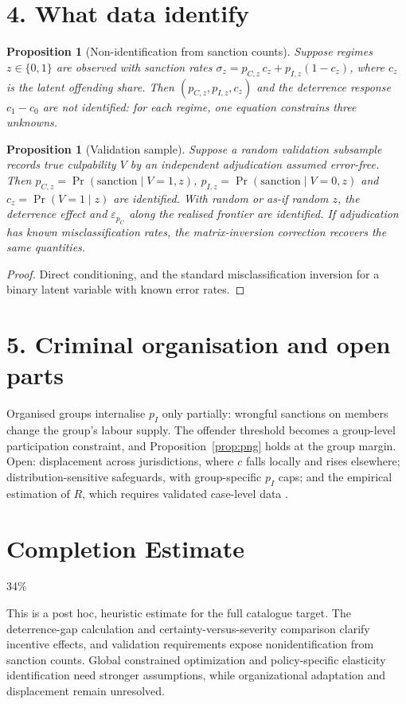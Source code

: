 \documentclass[11pt]{article}
\newtheorem{proposition}[theorem]{Proposition}
\theoremstyle{definition}
\begin{document}
\section*{4. What data identify}
\begin{proposition}[Non-identification from sanction counts]\label{prop:nonid}
Suppose regimes $z\in\{0,1\}$ are observed with sanction rates $\sigma_z=p_{C,z}\,c_z+p_{I,z}(1-c_z)$, where $c_z$ is the
latent offending share. Then $(p_{C,z},p_{I,z},c_z)$ and the deterrence response $c_1-c_0$ are not identified: for each
regime, one equation constrains three unknowns.
\end{proposition}
\begin{proposition}[Validation sample]\label{prop:val}
Suppose a random validation subsample records true culpability $V$ by an independent adjudication assumed error-free.
Then $p_{C,z}=\Pr(\text{sanction}\mid V=1,z)$, $p_{I,z}=\Pr(\text{sanction}\mid V=0,z)$ and $c_z=\Pr(V=1\mid z)$ are
identified. With random or as-if random $z$, the deterrence effect and $\varepsilon_{p_C}$ along the realised frontier are
identified. If adjudication has known misclassification rates, the matrix-inversion correction recovers the same quantities.
\end{proposition}
\begin{proof}
Direct conditioning, and the standard misclassification inversion for a binary latent variable with known error rates.
\end{proof}

\section*{5. Criminal organisation and open parts}
Organised groups internalise $p_I$ only partially: wrongful sanctions on members change the group's labour supply. The
offender threshold becomes a group-level participation constraint, and Proposition~\ref{prop:png} holds at the group
margin. Open: displacement across jurisdictions, where $c$ falls locally and rises elsewhere; distribution-sensitive
safeguards, with group-specific $p_I$ caps; and the empirical estimation of $R$, which requires validated case-level data
\cite{tsc}.

\section{Completion Estimate}
34\%

This is a post hoc, heuristic estimate for the full catalogue target.
The deterrence-gap calculation and certainty-versus-severity comparison clarify incentive effects, and validation requirements expose nonidentification from sanction counts. Global constrained optimization and policy-specific elasticity identification need stronger assumptions, while organizational adaptation and displacement remain unresolved.
\end{document}
